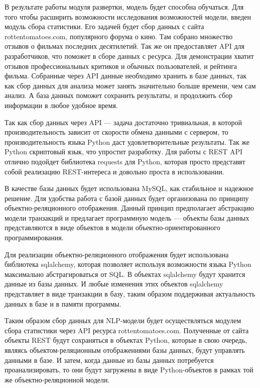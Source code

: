 В результате работы модуля развертки, модель будет способна обучаться. Для того чтобы расширить возможности исследования возможностей модели, введен модуль сбора статистики. Его задачей будет сбор данных с сайта rottentomatoes.com, популярного форума о кино. Там собрано множество отзывов о фильмах последних десятилетий. Так же он предоставляет API для разработчиков, что поможет в сборе данных с ресурса. Для демонстрации хватит отзывов профессиональных критиков и обычных пользователей, и рейтинга фильма. Собранные через API данные необходимо хранить в базе данных, так как сбор данных для анализа может занять значительно больше времени, чем сам анализ. А база данных поможет сохранить результаты, и продолжить сбор информации в любое удобное время.

Так как сбор данных через API --- задача достаточно тривиальная, в которой производительность зависит от скорости обмена данными с сервером, то производительность языка Python даст удовлетворительные результаты. Так же Python скриптовый язык, что упростит разработку. Для работы с REST API отлично подойдет библиотека requests для Python, которая просто представят собой реализацию REST-интереса и довольно проста в использовании.

В качестве базы данных будет использована MySQL, как стабильное и надежное решение. Для удобства работа с базой данных будет организована по принципу объектно-реляционного отображения. Данный принцип предполагает абстракцию модели транзакций и предлагает программную модель --- объекты базы данных представляются в виде объектов в модели объектно-ориентированного программирования.

Для реализации объектно-реляционного отображения будет использована библиотека sqlalchemy, которая позволяет используя возможности языка Python максимально абстрагироваться от SQL\@. В объектах sqlalchemy будут хранится данные из базы данных. И любые изменения этих объектов sqlalchemy представляет в виде транзакции в базу, таким образом поддерживая актуальность данных в базе и в памяти программы.

Таким образом сбор данных для NLP-модели будет осуществляться модулем сбора статистики через API ресурса rottentomatoes.com. Полученные от сайта объекты REST будут сохраняться в объектах Python, которые в свою очередь, являясь объектом-реляционным отображениями базы данных, будут управлять данными в базе. И затем, когда данные из базы данных потребуется проанализировать, то они будут загружены в виде Python-объектов в рамках той же объектно-реляционной модели.

